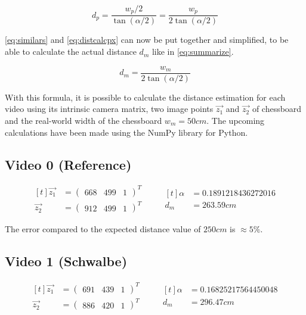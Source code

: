 \begin{equation} \label{eq:distcalcpx}
    d_p = \frac{w_p / 2}{\tan{\left(\alpha/2\right)}} = \frac{w_p}{2 \tan{\left(\alpha/2\right)}}
\end{equation}

\autoref{eq:similars} and \autoref{eq:distcalcpx} can now be put together and simplified, to be able to calculate the actual distance $d_m$ like in \autoref{eq:summarize}.

\begin{equation} \label{eq:summarize}
    d_m = \frac{w_m}{2\tan{\left(\alpha/2\right)}}
\end{equation}

With this formula, it is possible to calculate the distance estimation for each video using its intrinsic camera matrix, two image points $\vec{z_1}$ and $\vec{z_2}$ of chessboard and the real-world width of the chessboard $w_m = 50 cm$. The upcoming calculations have been made using the NumPy library for Python.

\subsection*{Video 0 (Reference)}

\begin{equation} \label{eq:video0}
    \begin{aligned}[t]
        \vec{z_1} &= \begin{pmatrix} 668 & 499 & 1 \end{pmatrix}^T \\
        \vec{z_2} &= \begin{pmatrix} 912 & 499 & 1 \end{pmatrix}^T
    \end{aligned}
    \qquad 
    \begin{aligned}[t]
        \alpha &= 0.1891218436272016\\
        d_m &= 263.59 cm
    \end{aligned}
\end{equation}

The error compared to the expected distance value of $250 cm$ is $\approx5 \%$.

\subsection*{Video 1 (Schwalbe)}

\begin{equation} \label{eq:video1}
    \begin{aligned}[t]
        \vec{z_1} &= \begin{pmatrix} 691 & 439 & 1 \end{pmatrix}^T \\
        \vec{z_2} &= \begin{pmatrix} 886 & 420 & 1 \end{pmatrix}^T
    \end{aligned}
    \qquad 
    \begin{aligned}[t]
        \alpha &= 0.16825217564450048\\
        d_m &= 296.47 cm
    \end{aligned}
\end{equation}

